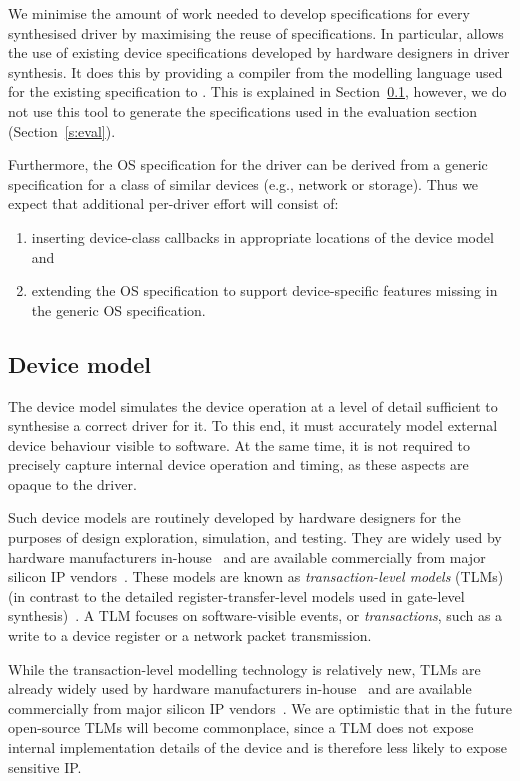 We minimise the amount of work needed to develop specifications for every synthesised driver by maximising the reuse of specifications.  In particular, \termite allows the use of existing device specifications developed by hardware designers in driver synthesis.  It does this by providing a compiler from the modelling language used for the existing specification to \tsl. This is explained in Section~\ref{sec:device_model}, however, we do not use this tool to generate the specifications used in the evaluation section (Section~\ref{s:eval}).

Furthermore, the OS specification for the driver can be derived from a generic specification for a class of similar devices (e.g., network or storage).  Thus we expect that additional per-driver effort will consist of: 
\begin{enumerate}
    \item inserting device-class callbacks in appropriate locations of the device model and 
    \item extending the OS specification to support device-specific features missing in the  generic OS specification.
\end{enumerate}

\subsection{Device model}
\label{sec:device_model}

The device model simulates the device operation at a level of detail sufficient to synthesise a correct driver for it.  To this end, it must accurately model external device behaviour visible to software.  At the same time, it is not required to precisely capture internal device operation and timing, as these aspects are opaque to the driver.

Such device models are routinely developed by hardware designers for the purposes of design exploration, simulation, and testing. They are widely used by hardware manufacturers in-house~\cite{cofluent} and are available commercially from major silicon IP vendors~\cite{vp}.  These models are known as \emph{transaction-level models} (TLMs) (in contrast to the detailed register-transfer-level models used in gate-level synthesis)~\cite{Cai_Gajski_03}.  A TLM focuses on software-visible events, or \emph{transactions}, such as a write to a device register or a network packet transmission.

While the transaction-level modelling technology is relatively new, TLMs are already widely used by hardware manufacturers in-house~\cite{cofluent} and are available commercially from major silicon IP vendors~\cite{vp}.  We are optimistic that in the future open-source TLMs will become commonplace, since a TLM does not expose internal implementation details of the device and is therefore less likely to expose sensitive IP.

